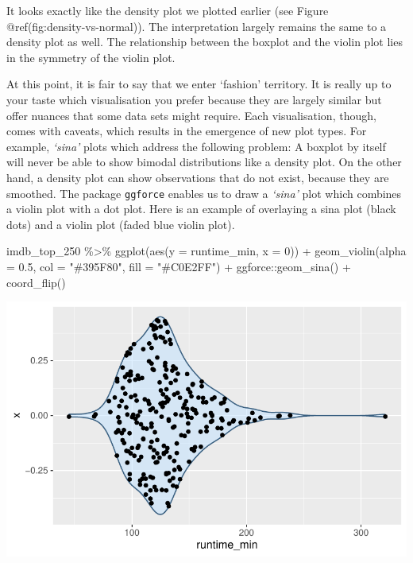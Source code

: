 \documentclass[
  letterpaper,
]{krantz}
\makeatletter
\newenvironment{Shaded}{\begin{snugshade}}{\end{snugshade}}
\newcommand{\AttributeTok}[1]{\textcolor[rgb]{0.40,0.45,0.13}{#1}}
\newcommand{\DecValTok}[1]{\textcolor[rgb]{0.68,0.00,0.00}{#1}}
\newcommand{\FloatTok}[1]{\textcolor[rgb]{0.68,0.00,0.00}{#1}}
\newcommand{\FunctionTok}[1]{\textcolor[rgb]{0.28,0.35,0.67}{#1}}
\newcommand{\NormalTok}[1]{\textcolor[rgb]{0.00,0.23,0.31}{#1}}
\newcommand{\SpecialCharTok}[1]{\textcolor[rgb]{0.37,0.37,0.37}{#1}}
\newcommand{\StringTok}[1]{\textcolor[rgb]{0.13,0.47,0.30}{#1}}
\newenvironment{kframe}{%
\medskip{}
\setlength{\fboxsep}{.8em}
 \def\at@end@of@kframe{}%
 \ifinner\ifhmode%
  \def\at@end@of@kframe{\end{minipage}}%
  \begin{minipage}{\columnwidth}%
 \fi\fi%
 \def\FrameCommand##1{\hskip\@totalleftmargin \hskip-\fboxsep
 \colorbox{shadecolor}{##1}\hskip-\fboxsep
     \hskip-\linewidth \hskip-\@totalleftmargin \hskip\columnwidth}%
 \MakeFramed {\advance\hsize-\width
   \@totalleftmargin\z@ \linewidth\hsize
   \@setminipage}}%
 {\par\unskip\endMakeFramed%
 \at@end@of@kframe}
\renewenvironment{Shaded}{\begin{kframe}}{\end{kframe}}
\makeatother
\begin{document}
It looks exactly like the density plot we plotted earlier (see Figure
@ref(fig:density-vs-normal)). The interpretation largely remains the
same to a density plot as well. The relationship between the boxplot and
the violin plot lies in the symmetry of the violin plot.

At this point, it is fair to say that we enter `fashion' territory. It
is really up to your taste which visualisation you prefer because they
are largely similar but offer nuances that some data sets might require.
Each visualisation, though, comes with caveats, which results in the
emergence of new plot types. For example, \emph{`sina'} plots which
address the following problem: A boxplot by itself will never be able to
show bimodal distributions like a density plot. On the other hand, a
density plot can show observations that do not exist, because they are
smoothed. The package \texttt{ggforce} enables us to draw a
\emph{`sina'} plot which combines a violin plot with a dot plot. Here is
an example of overlaying a sina plot (black dots) and a violin plot
(faded blue violin plot).

\begin{Shaded}
\begin{Highlighting}[]
\NormalTok{imdb\_top\_250 }\SpecialCharTok{\%\textgreater{}\%}
  \FunctionTok{ggplot}\NormalTok{(}\FunctionTok{aes}\NormalTok{(}\AttributeTok{y =}\NormalTok{ runtime\_min, }\AttributeTok{x =} \DecValTok{0}\NormalTok{)) }\SpecialCharTok{+}
  \FunctionTok{geom\_violin}\NormalTok{(}\AttributeTok{alpha =} \FloatTok{0.5}\NormalTok{, }\AttributeTok{col =} \StringTok{"\#395F80"}\NormalTok{, }\AttributeTok{fill =} \StringTok{"\#C0E2FF"}\NormalTok{) }\SpecialCharTok{+}
\NormalTok{  ggforce}\SpecialCharTok{::}\FunctionTok{geom\_sina}\NormalTok{() }\SpecialCharTok{+}
  \FunctionTok{coord\_flip}\NormalTok{()}
\end{Highlighting}
\end{Shaded}

\includegraphics{08_descriptive_statistics_files/figure-pdf/sina-plots-1.pdf}
\end{document}
